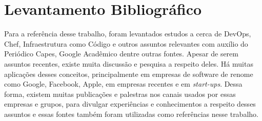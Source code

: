 \section{Levantamento Bibliográfico}

Para a referência desse trabalho, foram levantados estudos a cerca de
\mbox{DevOps}, Chef, Infraestrutura como Código e outros assuntos relevantes com
auxílio do Periódico Capes, Google Acadêmico dentre outras fontes.
Apesar de serem assuntos recentes, existe muita discussão e pesquisa a
respeito deles. Há muitas aplicações desses conceitos, principalmente
em empresas de software de renome como Google, Facebook, Apple, em
empresas recentes e em \textit{start-ups}. Dessa forma, existem muitas publicações e
palestras nos canais usados por essas empresas e grupos, para divulgar
experiências e conhecimentos a respeito desses assuntos e essas fontes
também foram utilizadas como referências nesse trabalho.

